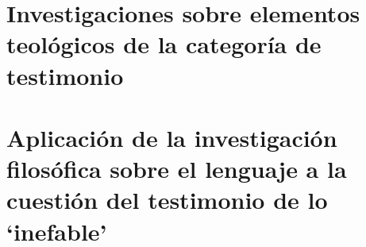 

\section{Investigaciones sobre elementos teológicos de la categoría de testimonio}



\setcounter{subsubsection}{1}


\setcounter{subsubsection}{2}


\setcounter{subsubsection}{3}


\setcounter{subsubsection}{4}



\section{Aplicación de la investigación filosófica sobre el lenguaje a la cuestión del testimonio de lo `inefable'}




%

%

